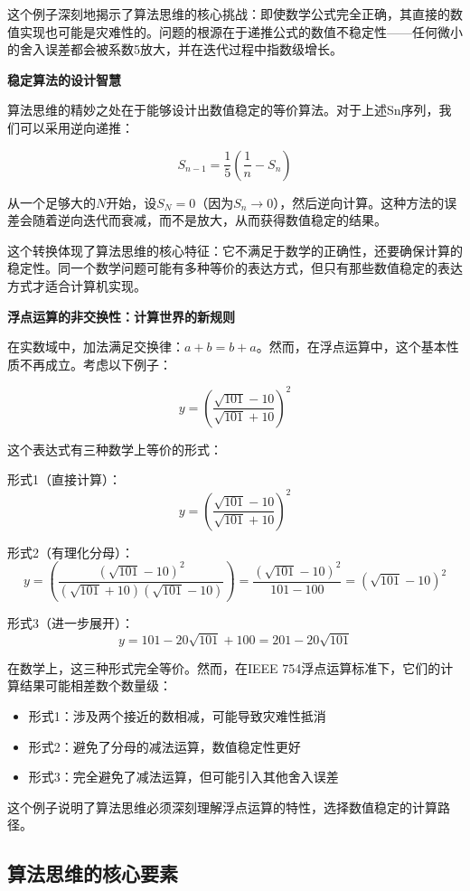 这个例子深刻地揭示了算法思维的核心挑战：即使数学公式完全正确，其直接的数值实现也可能是灾难性的。问题的根源在于递推公式的数值不稳定性——任何微小的舍入误差都会被系数5放大，并在迭代过程中指数级增长。

\textbf{稳定算法的设计智慧}

算法思维的精妙之处在于能够设计出数值稳定的等价算法。对于上述Sn序列，我们可以采用逆向递推：

$$S_{n-1} = \frac{1}{5}\left(\frac{1}{n} - S_n\right)$$

从一个足够大的$N$开始，设$S_N = 0$（因为$S_n \to 0$），然后逆向计算。这种方法的误差会随着逆向迭代而衰减，而不是放大，从而获得数值稳定的结果。

这个转换体现了算法思维的核心特征：它不满足于数学的正确性，还要确保计算的稳定性。同一个数学问题可能有多种等价的表达方式，但只有那些数值稳定的表达方式才适合计算机实现。

\textbf{浮点运算的非交换性：计算世界的新规则}

在实数域中，加法满足交换律：$a + b = b + a$。然而，在浮点运算中，这个基本性质不再成立。考虑以下例子：

$$y = \left(\frac{\sqrt{101} - 10}{\sqrt{101} + 10}\right)^2$$

这个表达式有三种数学上等价的形式：

形式1（直接计算）：
$$y = \left(\frac{\sqrt{101} - 10}{\sqrt{101} + 10}\right)^2$$

形式2（有理化分母）：
$$y = \left(\frac{(\sqrt{101} - 10)^2}{(\sqrt{101} + 10)(\sqrt{101} - 10)}\right) = \frac{(\sqrt{101} - 10)^2}{101 - 100} = (\sqrt{101} - 10)^2$$

形式3（进一步展开）：
$$y = 101 - 20\sqrt{101} + 100 = 201 - 20\sqrt{101}$$

在数学上，这三种形式完全等价。然而，在IEEE 754浮点运算标准下，它们的计算结果可能相差数个数量级：

\begin{itemize}
\item 形式1：涉及两个接近的数相减，可能导致灾难性抵消
\item 形式2：避免了分母的减法运算，数值稳定性更好
\item 形式3：完全避免了减法运算，但可能引入其他舍入误差
\end{itemize}

这个例子说明了算法思维必须深刻理解浮点运算的特性，选择数值稳定的计算路径。

\subsection{算法思维的核心要素}

